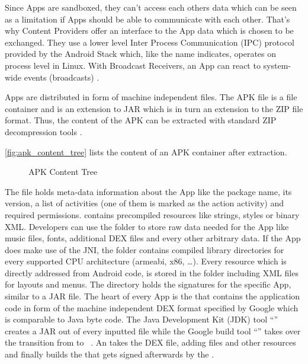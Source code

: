 Since Apps are sandboxed, they can't access each others data which can be seen as a limitation if Apps should be able to communicate with each other.
That's why Content Providers offer an interface to the App
data which is chosen to be exchanged.
They use a lower level Inter Process Communication (IPC) protocol
provided by the Android Stack which, like the name indicates, operates
on process level in Linux.
With Broadcast Receivers, an App can react to system-wide events
(broadcasts) \parencite[ch.1]{securityinternals}.

Apps are distributed in form of machine independent  files.
The APK file is a file container and is an extension to
JAR which is in turn an extension to the ZIP file format.
Thus, the content of the APK can be extracted with standard ZIP
decompression tools \parencite{securityinternals}.

\autoref{fig:apk_content_tree} lists the content of an APK container
after extraction.

\begin{figure}[htb]
\caption[APK Content Tree]{APK Content Tree}
\label{fig:apk_content_tree}
\end{figure}

The  file holds meta-data information
about the App like the package name, its version, a list of
activities (one of them is marked as the action  activity) and required permissions. 
contains precompiled resources like strings, styles
or binary XML. Developers can use the  folder
to store raw data needed for the App like music files,
fonts, additional DEX files and every other arbitrary data.
If the App does make use of the JNI,
the  folder contains compiled library directories
for every supported CPU architecture (armeabi, x86, \ldots).
Every resource which is directly addressed from Android code,
is stored in the  folder including XML files for
layouts and menus. The  directory holds
the signatures for the specific App, similar to a JAR file.
The heart of every App is the  that
contains the application code in form of the machine independent
DEX format specified by Google \parencite{dex} which is comparable to
Java byte code. The Java Development
Kit (JDK) tool ``'' creates a JAR out of every inputted
  file while the Google build tool ``'' takes over
 the transition from  to  ~\parencite{dxtool}.
 An  takes the DEX file, adding  files and
 other resources and finally builds the  that gets signed
 afterwards by the .

